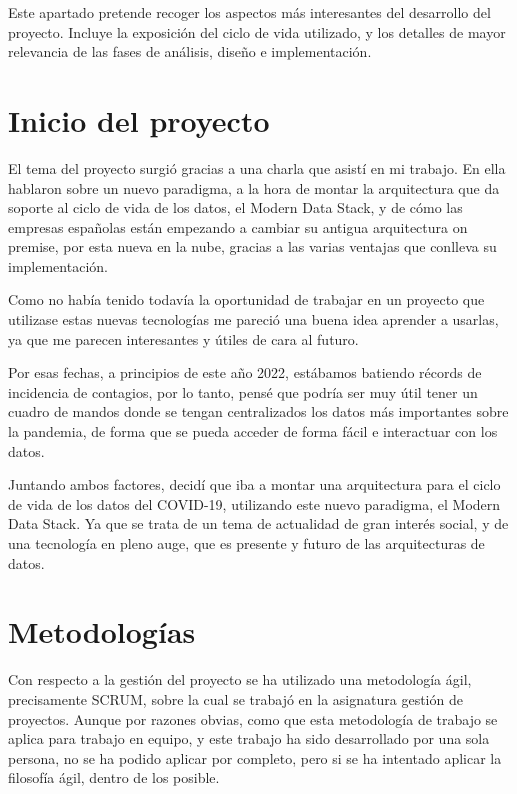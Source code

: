 
Este apartado pretende recoger los aspectos más interesantes del desarrollo del proyecto.
Incluye la exposición del ciclo de vida utilizado, y los detalles de mayor relevancia de las fases de análisis, diseño e implementación.

\section{Inicio del proyecto}

El tema del proyecto surgió gracias a una charla que asistí en mi trabajo. En ella hablaron sobre un nuevo paradigma, a la hora de montar la arquitectura que da soporte al ciclo de vida de los datos, el Modern Data Stack, y de cómo las empresas españolas están empezando a cambiar su antigua arquitectura on premise, por esta nueva en la nube, gracias a las varias ventajas que conlleva su implementación.

Como no había tenido todavía la oportunidad de trabajar en un proyecto que utilizase estas nuevas tecnologías me pareció una buena idea aprender a usarlas, ya que me parecen interesantes y útiles de cara al futuro.

Por esas fechas, a principios de este año 2022, estábamos batiendo récords de incidencia de contagios, por lo tanto, pensé que podría ser muy útil tener un cuadro de mandos donde se tengan centralizados los datos más importantes sobre la pandemia, de forma que se pueda acceder de forma fácil e interactuar con los datos.

Juntando ambos factores, decidí que iba a montar una arquitectura para el ciclo de vida de los datos del COVID-19, utilizando este nuevo paradigma, el Modern Data Stack. Ya que se trata de un tema de actualidad de gran interés social, y de una tecnología en pleno auge, que es presente y futuro de las arquitecturas de datos.

\section{Metodologías}

Con respecto a la gestión del proyecto se ha utilizado una metodología ágil, precisamente
SCRUM, sobre la cual se trabajó en la asignatura gestión de proyectos. Aunque por razones obvias, como que esta metodología de trabajo se aplica para trabajo en equipo, y este trabajo ha sido desarrollado por una sola persona, no se ha podido aplicar por completo, pero si se ha intentado aplicar la filosofía ágil, dentro de los posible.

